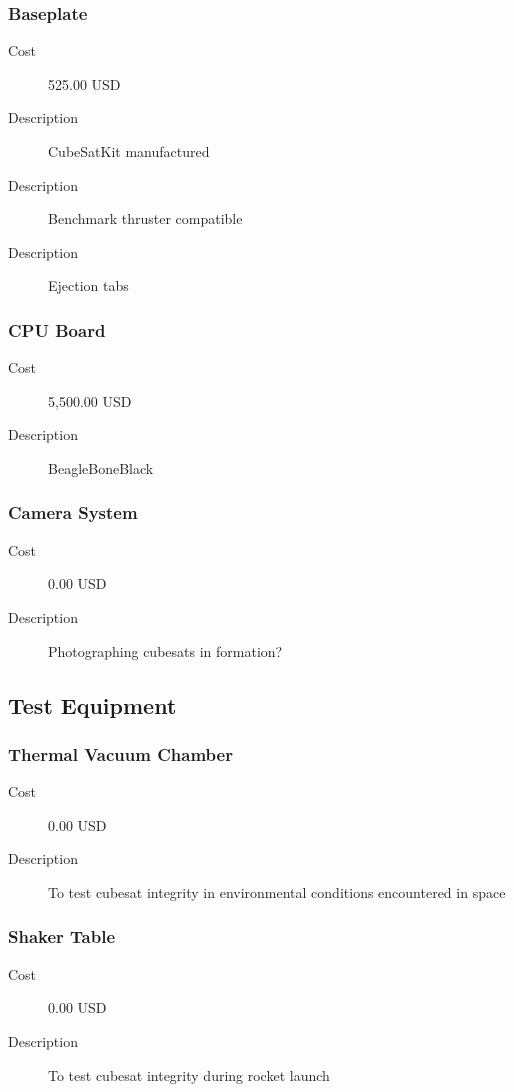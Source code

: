 \subsubsection{Baseplate}
\begin{description}
\item[Cost] 525.00 USD
\item[Description] CubeSatKit manufactured
\item[Description] Benchmark thruster compatible
\item[Description] Ejection tabs
\end{description}

\subsubsection{CPU Board}
\begin{description}
\item[Cost] 5,500.00 USD
\item[Description] BeagleBoneBlack
\end{description}

\subsubsection{Camera System}
\begin{description}
\item[Cost] 0.00 USD
\item[Description] Photographing cubesats in formation?
\end{description}


\subsection{Test Equipment}

\subsubsection{Thermal Vacuum Chamber}
\begin{description}
\item[Cost] 0.00 USD
\item[Description] To test cubesat integrity in environmental conditions encountered in space
\end{description}

\subsubsection{Shaker Table}
\begin{description}
\item[Cost] 0.00 USD
\item[Description] To test cubesat integrity during rocket launch
\end{description}

